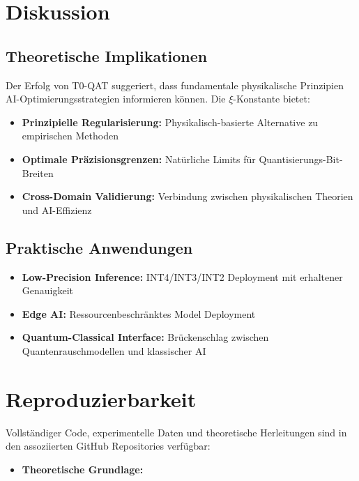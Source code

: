 	\section{Diskussion}
	
	\subsection{Theoretische Implikationen}
	
	Der Erfolg von T0-QAT suggeriert, dass fundamentale physikalische Prinzipien AI-Optimierungsstrategien informieren können. Die $\xi$-Konstante bietet:
	
	\begin{itemize}
		\item \textbf{Prinzipielle Regularisierung:} Physikalisch-basierte Alternative zu empirischen Methoden
		\item \textbf{Optimale Präzisionsgrenzen:} Natürliche Limits für Quantisierungs-Bit-Breiten
		\item \textbf{Cross-Domain Validierung:} Verbindung zwischen physikalischen Theorien und AI-Effizienz
	\end{itemize}
	
	\subsection{Praktische Anwendungen}
	
	\begin{itemize}
		\item \textbf{Low-Precision Inference:} INT4/INT3/INT2 Deployment mit erhaltener Genauigkeit
		\item \textbf{Edge AI:} Ressourcenbeschränktes Model Deployment
		\item \textbf{Quantum-Classical Interface:} Brückenschlag zwischen Quantenrauschmodellen und klassischer AI
	\end{itemize}
	
	\section*{Reproduzierbarkeit}
	
	Vollständiger Code, experimentelle Daten und theoretische Herleitungen sind in den assoziierten GitHub Repositories verfügbar:
	
	\begin{itemize}
		\item \textbf{Theoretische Grundlage:} 
	\end{itemize}
	
